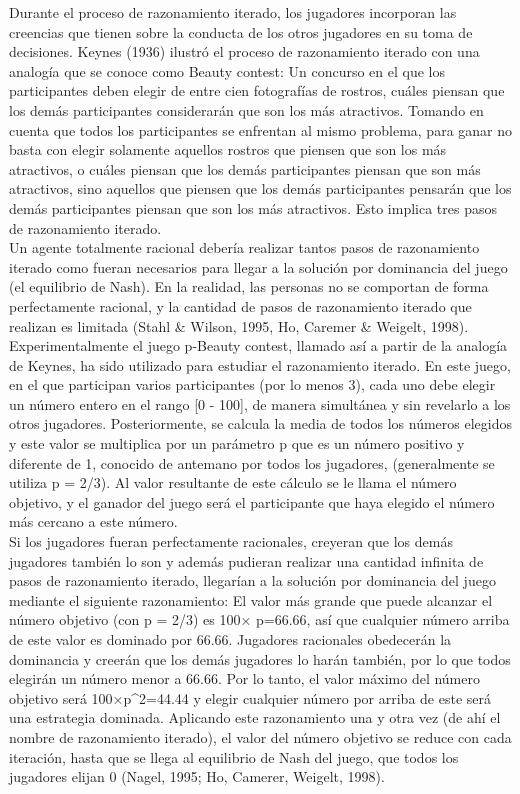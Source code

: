 Durante el proceso de razonamiento iterado, los jugadores incorporan las creencias que tienen sobre la conducta de los otros jugadores en su toma de decisiones. Keynes (1936) ilustró el proceso de razonamiento iterado con una analogía que se conoce como Beauty contest: Un concurso en el que los participantes deben elegir de entre cien fotografías de rostros, cuáles piensan que los demás participantes considerarán que son los más atractivos. Tomando en cuenta que todos los participantes se enfrentan al mismo problema, para ganar no basta con elegir solamente aquellos rostros que piensen que son los más atractivos, o cuáles piensan que los demás participantes piensan que son más atractivos, sino aquellos que piensen que los demás participantes pensarán que los demás participantes piensan que son los más atractivos. Esto implica tres pasos de razonamiento iterado.\\

Un agente totalmente racional debería realizar tantos pasos de razonamiento iterado como fueran necesarios para llegar a la solución por dominancia del juego (el equilibrio de Nash). En la realidad, las personas no se comportan de forma perfectamente racional, y la cantidad de pasos de razonamiento iterado que realizan es limitada (Stahl & Wilson, 1995, Ho, Caremer & Weigelt, 1998).
Experimentalmente el juego p-Beauty contest, llamado así a partir de la analogía de Keynes, ha sido utilizado para estudiar el razonamiento iterado. En este juego, en el que participan varios participantes (por lo menos 3), cada uno debe elegir un número entero en el rango [0 - 100], de manera simultánea y sin revelarlo a los otros jugadores. Posteriormente, se calcula la media de todos los números elegidos y este valor se multiplica por un parámetro p que es un número positivo y diferente de 1, conocido de antemano por todos los jugadores, (generalmente se utiliza p = 2/3). Al valor resultante de este cálculo se le llama el número objetivo, y el ganador del juego será el participante que haya elegido el número más cercano a este número.\\

Si los jugadores fueran perfectamente racionales, creyeran que los demás jugadores también lo son y además pudieran realizar una cantidad infinita de pasos de razonamiento iterado, llegarían a la solución por dominancia del juego mediante el siguiente razonamiento: El valor más grande que puede alcanzar el número objetivo (con p = 2/3) es 100× p=66.66, así que cualquier número arriba de este valor es dominado por 66.66. Jugadores racionales obedecerán la dominancia y creerán que los demás jugadores lo harán también, por lo que todos elegirán un número menor a 66.66. Por lo tanto, el valor máximo del número objetivo será 100×p^2=44.44 y elegir cualquier número por arriba de este será una estrategia dominada. Aplicando este razonamiento una y otra vez (de ahí el nombre de razonamiento iterado), el valor del número objetivo se reduce con cada iteración, hasta que se llega al equilibrio de Nash del juego, que todos los jugadores elijan 0 (Nagel, 1995; Ho, Camerer, Weigelt, 1998).\\

